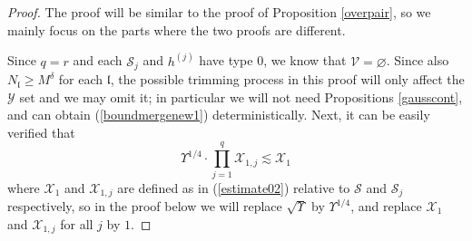 \documentclass[11 pt,reqno]{amsart}
\theoremstyle{definition}
\theoremstyle{remark}
\numberwithin{equation}{section}
\newcommand{\Sc}{\mathcal{S}}
\newcommand{\Vc}{\mathcal{V}}
\newcommand{\Xc}{\mathcal{X}}
\newcommand{\Yc}{\mathcal{Y}}
\newcommand{\lf}{\mathfrak{l}}
\begin{document}
{\begin{proof}The proof will be similar to the proof of Proposition \ref{overpair}, so we mainly focus on the parts where the two proofs are different.

Since $q=r$ and each $\Sc_j$ and $h^{(j)}$ have type 0, we know that $\Vc =\varnothing$. Since also $N_\lf\geq M^\delta$ for each $\lf$, the possible trimming process in this proof will only affect the $\Yc$ set and we may omit it; in particular we will not need Propositions \ref{gausscont}, and can obtain (\ref{boundmergenew1}) deterministically. Next, it can be easily verified that \[\Upsilon^{1/4}\cdot\prod_{j=1}^q\Xc_{1,j}\lesssim \Xc_1\] where 
$\Xc_1$ and $\Xc_{1,j}$ are defined as in (\ref{estimate02}) relative to $\Sc$ and $\Sc_j$ respectively, so in the proof below we will replace $\sqrt{\Upsilon}$ by $\Upsilon^{1/4}$, and replace $\Xc_1$ and $\Xc_{1,j}$ for all $j$ by $1$.


\end{proof}}
\end{document}
